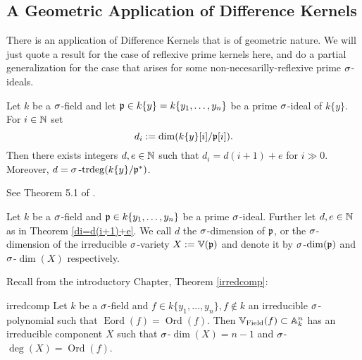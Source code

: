 \subsection{A Geometric Application of Difference Kernels}

There is an application of Difference Kernels that is of geometric nature. We will just quote a result for the case of reflexive prime kernels here,
and do a partial generalization for the case that arises for some non-necesarilly-reflexive prime $\sigma$-ideals.

\begin{theorem}\label{di=d(i+1)+e}
Let $k$ be a $\sigma$-field and let $\mathfrak{p} \in k\{y\} = k\{y_1,\ldots,y_n\}$ be a prime $\sigma$-ideal of $k\{y\}$. For $i \in \mathbb{N}$ set $$d_i := \dim(k\{y\}[i]/\mathfrak{p}[i]).$$
Then there exists integers $d, e \in \mathbb{N}$ such that $d_i = d(i+1) + e$ for $i \gg 0$. Moreover, $d = \sigma\operatorname{-trdeg}(k\{y\}/\mathfrak{p}^*)$.
\begin{bew}
See Theorem 5.1 of \cite{wibmer}.
\end{bew}
\end{theorem}

\begin{defn}
Let $k$ be a $\sigma$-field and $\mathfrak{p} \in k\{y_1,\ldots,y_n\}$ be a prime $\sigma$-ideal. Further let $d, e \in \mathbb{N}$ as in Theorem \ref{di=d(i+1)+e}. We call $d$ the $\sigma$-dimension of $\mathfrak{p}$, 
or the $\sigma$-dimension of the irreducible $\sigma$-variety $X:= \mathbb{V}(\mathfrak{p})$ and denote it by $\sigma$-$\dim(\mathfrak{p})$ and $\sigma$-$\dim(X)$ respectively.
\end{defn}

Recall from the introductory Chapter, Theorem \ref{irredcomp}:
\begin{reptheorem}{irredcomp}
Let $k$ be a $\sigma$-field and $f \in k\{y_1,\ldots,y_n\}, f \notin k$ an irreducible $\sigma$-polynomial such that $\operatorname{Eord}(f) = \operatorname{Ord}(f)$. Then $\mathbb{V}_{\operatorname{Field}}(f) \subset \mathbb{A}_k^n$ has an irreducible component $X$ such that $\sigma$-$\dim(X) = n-1$ and $\sigma$-$\operatorname{deg}(X) = \operatorname{Ord}(f)$.
\end{reptheorem}

